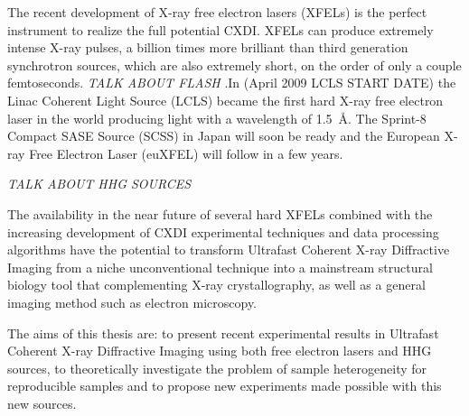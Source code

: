 The recent development of X-ray free electron lasers (XFELs) is the perfect
instrument to realize the full potential CXDI. XFELs can produce extremely
intense X-ray pulses, a billion times more brilliant than third
generation synchrotron sources, which are also extremely short, on the order of
only a couple femtoseconds. {\em TALK ABOUT FLASH} .In (April 2009 LCLS START DATE) the Linac Coherent Light Source (LCLS)
became the first hard X-ray free electron laser in the world producing light
with a wavelength of \mbox{1.5 \AA}. The Sprint-8 Compact SASE Source (SCSS) in
Japan will soon be ready and the European X-ray Free Electron Laser (euXFEL)
will follow in a few years.

{\em TALK ABOUT HHG SOURCES}

The availability in the near future of several hard XFELs combined with the
increasing development of CXDI experimental techniques and data processing
algorithms have the potential to transform Ultrafast Coherent X-ray Diffractive
Imaging from a niche unconventional technique into a mainstream structural
biology tool that complementing X-ray crystallography, as well as a general
imaging method such as electron microscopy.


The aims of this thesis are: to present recent experimental results in Ultrafast
Coherent X-ray Diffractive Imaging using both free electron lasers and
HHG sources, to theoretically investigate the problem of sample heterogeneity
for reproducible samples and to propose new experiments made possible with this
new sources.